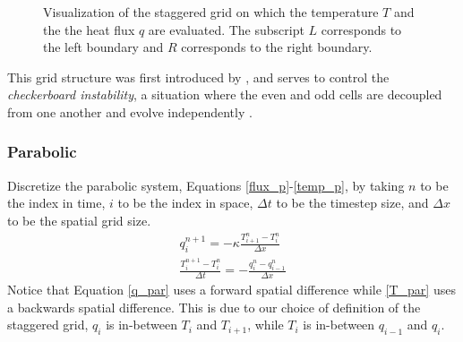 \documentclass[iop]{emulateapj}
\begin{document}
					\begin{figure}[H]
						\centering
						\caption{Visualization of the staggered grid on which the temperature $T$ and the the heat flux $q$ are evaluated. The subscript $L$ corresponds to the left boundary and $R$ corresponds to the right boundary.}
						\label{staggered}
					\end{figure}
					This grid structure was first introduced by \cite{1965PhFl....8.2182H}, and serves to control the \textit{checkerboard instability}, a situation where the even and odd cells are decoupled from one another and evolve independently \citep{cfd_book}. 
		
			\subsubsection{Parabolic}
			
				Discretize the parabolic system, Equations \ref{flux_p}-\ref{temp_p}, by taking $n$ to be the index in time, $i$ to be the index in space, $\Delta t$ to be the timestep size, and $\Delta x$ to be the spatial grid size.
				\begin{gather}
					q_i^{n+1} = - \kappa \frac{T_{i+1}^n - T_i^n}{\Delta x} \label{q_par}\\
					\frac{T_i^{n+1} - T_i^n}{\Delta t} = - \frac{q_i^n - q_{i-1}^n}{\Delta x} \label{T_par}
				\end{gather}
				Notice that Equation \ref{q_par} uses a forward spatial difference while \ref{T_par} uses a backwards spatial difference. 
					This is due to our choice of definition of the staggered grid, $q_i$ is in-between $T_i$ and $T_{i+1}$, while $T_i$ is in-between $q_{i-1}$ and $q_i$.
					
\end{document}
